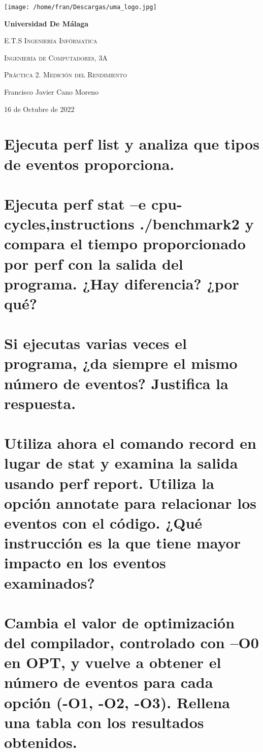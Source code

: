 \documentclass[12pt]{article}
\begin{document}
	\begin{titlepage}	
		\centering
		{\texttt{[image: /home/fran/Descargas/uma\_logo.jpg]}\par}
		\vspace{0.1cm}
		\centering	
		{\bfseries\LARGE Universidad De Málaga \par}
		\vspace{1cm}
		{\scshape\Large E.T.S Ingeniería Infórmatica\par}
		\vspace{1cm}
		{\scshape\large Ingeniería de Computadores, 3A\par}
		\vspace{3cm}
		{\scshape\Huge Práctica 2. Medición del Rendimiento\par}
		\vspace{3cm}
		{\Large Francisco Javier Cano Moreno\par}
		\vspace{1cm}
		{\Large 16 de Octubre de 2022 \par}
	\end{titlepage}

    \section{Ejecuta perf list y analiza que tipos de eventos proporciona.} 

    \section{Ejecuta perf stat –e cpu-cycles,instructions ./benchmark2 y
    compara el tiempo proporcionado por perf con la salida del programa. ¿Hay
    diferencia? ¿por qué?}

    \section{Si ejecutas varias veces el programa, ¿da siempre el mismo número de eventos?
    Justifica la respuesta.}

    \section{Utiliza ahora el comando record en lugar de stat y examina la salida usando
    perf report. Utiliza la opción annotate para relacionar los eventos con el
    código. ¿Qué instrucción es la que tiene mayor impacto en los eventos
    examinados?}

    \section{Cambia el valor de optimización del compilador, controlado con –O0 en OPT, y
    vuelve a obtener el número de eventos para cada opción (-O1, -O2, -O3). Rellena
    una tabla con los resultados obtenidos.}
\end{document}
